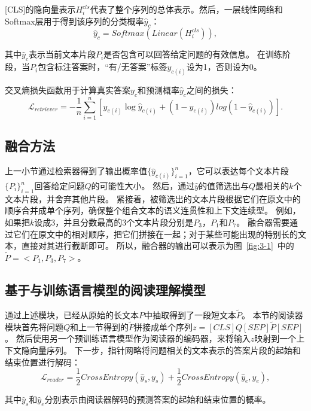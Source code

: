 [CLS]的隐向量表示$H^{cls}_i$代表了整个序列的总体表示。然后，一层线性网络和Softmax层用于得到该序列的分类概率$\hat y_c$：
\begin{equation}
    \hat y_c=Softmax(Linear(H_i^{cls})),
\end{equation}

其中$\hat y_c$表示当前文本片段$P_i$是否包含可以回答给定问题的有效信息\cite{zhang2020retrospective}。
在训练阶段，当$P_i$包含标注答案时，“有/无答案”标签$y_{c(i)}$设为1，否则设为0。

交叉熵损失函数用于计算真实答案$y_c$和预测概率$\hat y_c$之间的损失：
\begin{equation}
    \mathcal  L_{retriever}  = -\frac{1}{n}\sum_{i=1}^{n}[y_{c(i)}\log\hat y_{c(i)}+(1-y_{c(i)})log(1-\hat y_{c(i)})].
\end{equation}

\subsection{融合方法}
上一小节通过检索器得到了输出概率值$\{\hat y_{c(i)}\}^n_{i=1}$，它可以表达每个文本片段$\{P_i\}^n_{i=1}$回答给定问题$Q$的可能性大小。
然后，通过$\hat y$的值筛选出与$Q$最相关的$k$个文本片段，并舍弃其他片段。
紧接着，被筛选出的文本片段根据它们在原文中的顺序合并成单个序列，确保整个组合文本的语义连贯性和上下文连续型。
例如，如果把$k$设成3，并且分数最高的3个文本片段分别是$P_3$，$P_1$和$P_7$。
融合器需要通过它们在原文中的相对顺序，把它们拼接在一起；对于某些可能出现的特别长的文本，直接对其进行截断即可。
所以，融合器的输出可以表示为图~\ref{fig:3-1}~中的$\tilde P=<P_1,P_3,P_7>$。

\subsection{基于与训练语言模型的阅读理解模型}
通过上述模块，已经从原始的长文本$P$中抽取得到了一段短文本$\tilde P$。
本节的阅读器模块首先将问题$Q$和上一节得到的$\tilde P$拼接成单个序列$z=[CLS]Q[SEP]\tilde P[SEP]$。
然后使用另一个预训练语言模型\cite{devlin2018bert}作为阅读器的编码器，来将输入$z$映射到一个上下文隐向量序列。
下一步，指针网略将问题相关的文本表示的答案片段的起始和结束位置进行解码：
\begin{equation}
    \mathcal L_{reader} = \frac{1}{2} CrossEntropy(\hat y_s,y_s) + \frac{1}{2} CrossEntropy(\hat y_e,y_e),
\end{equation}

其中$\hat y_s$和$\hat y_e$分别表示由阅读器解码的预测答案的起始和结束位置的概率。

